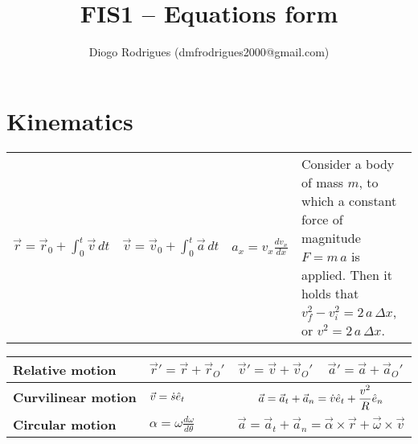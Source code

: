 \documentclass{form}
\author{Diogo Rodrigues (dmfrodrigues2000@gmail.com)}
\title{FIS1 -- Equations form}
\begin{document}
\section*{Kinematics}
\begin{center} \begin{tabular}{c | c | c | p{115mm}}
    $\displaystyle \vec{r} = \vec{r}_0 + \int_0^t{\vec{v}\,dt}$ &
    $\displaystyle \vec{v} = \vec{v}_0 + \int_0^t{\vec{a}\,dt}$ &
    $\displaystyle a_x = v_x \frac{dv_x}{dx}$ &
    Consider a body of mass $m$, to which a constant force of magnitude $F=m\,a$ is applied. Then it holds that $v_f^2 - v_i^2 = 2\,a\,\Delta x$, or $v^2 = 2\,a\,\Delta x$.
\end{tabular} \end{center}

\begin{center}
    \setlength\extrarowheight{9pt}
    \begin{tabular}{p{50mm} | P{44mm} | P{44mm} | P{44mm}}
        \textbf{Relative motion} & $\vec{r}' = \vec{r} + \vec{r}_O'$ & $\vec{v}' = \vec{v} + \vec{v}_O'$ & $\vec{a}' = \vec{a} + \vec{a}_O'$ \\[7pt] \hline
        \textbf{Curvilinear motion} & $\vec{v} = \dot{s} \hat{e}_t$ &  \\[7pt] \hline
        \textbf{Circular motion} & $\displaystyle \alpha = \omega \frac{d\omega}{d\theta}$ &  \\[7pt]
    \end{tabular}
\end{center}
\end{document}
